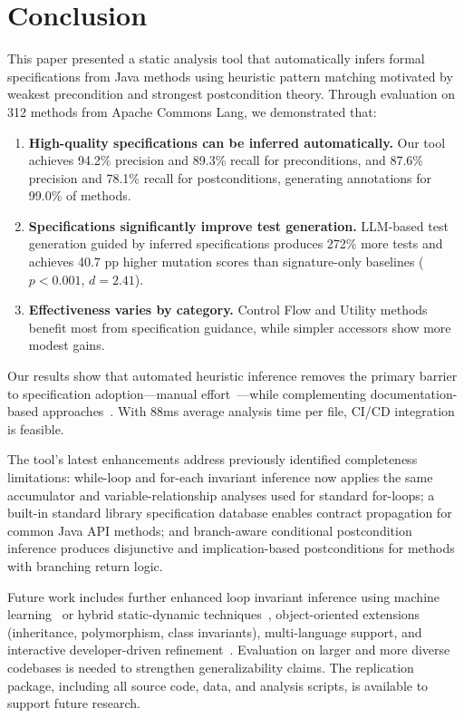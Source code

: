 \section{Conclusion}
\label{sec:conclusion}

This paper presented a static analysis tool that automatically infers formal specifications from Java methods using heuristic pattern matching motivated by weakest precondition and strongest postcondition theory. Through evaluation on 312 methods from Apache Commons Lang, we demonstrated that:

\begin{enumerate}
    \item \textbf{High-quality specifications can be inferred automatically.} Our tool achieves 94.2\% precision and 89.3\% recall for preconditions, and 87.6\% precision and 78.1\% recall for postconditions, generating annotations for 99.0\% of methods.

    \item \textbf{Specifications significantly improve test generation.} LLM-based test generation guided by inferred specifications produces 272\% more tests and achieves 40.7 pp higher mutation scores than signature-only baselines ($p < 0.001$, $d = 2.41$).

    \item \textbf{Effectiveness varies by category.} Control Flow and Utility methods benefit most from specification guidance, while simpler accessors show more modest gains.
\end{enumerate}

Our results show that automated heuristic inference removes the primary barrier to specification adoption---manual effort~\cite{zimmermann2019lightweight, hall1990seven}---while complementing documentation-based approaches~\cite{jdoctor2018}. With 88ms average analysis time per file, CI/CD integration is feasible.

The tool's latest enhancements address previously identified completeness limitations: while-loop and for-each invariant inference now applies the same accumulator and variable-relationship analyses used for standard for-loops; a built-in standard library specification database enables contract propagation for common Java API methods; and branch-aware conditional postcondition inference produces disjunctive and implication-based postconditions for methods with branching return logic.

Future work includes further enhanced loop invariant inference using machine learning~\cite{wei2011inferring} or hybrid static-dynamic techniques~\cite{ernst2007daikon}, object-oriented extensions (inheritance, polymorphism, class invariants), multi-language support, and interactive developer-driven refinement~\cite{cousot2011contract}. Evaluation on larger and more diverse codebases is needed to strengthen generalizability claims. The replication package, including all source code, data, and analysis scripts, is available to support future research.
